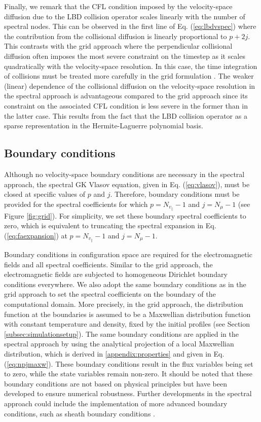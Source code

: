 \documentclass[preprint,12pt]{elsarticle}
\begin{document}
Finally, we remark that the CFL condition imposed by the velocity-space diffusion due to the LBD collision operator scales linearly with the number of spectral nodes. This can be observed in the first line of Eq. (\ref{eq:lbdvspec}) where the contribution from the collisional diffusion is linearly proportional to $p + 2j$. This contrasts with the grid approach where the perpendicular collisional diffusion often imposes the most severe constraint on the timestep as it scales quadratically with the velocity-space resolution. In this case, the time integration of collisions must be treated more carefully in the grid formulation \cite{ulbl2023}. The weaker (linear) dependence of the collisional diffusion on the velocity-space resolution in the spectral approach is advantageous compared to the grid approach since its constraint on the associated CFL condition is less severe in the former than in the latter case. This results from the fact that the LBD collision operator as a sparse representation in the Hermite-Laguerre polynomial basis. 

\subsection{Boundary conditions}
\label{subsec:boundaryconditions}

Although no velocity-space boundary conditions are necessary in the spectral approach, the spectral GK Vlasov equation, given in Eq. (\ref{eq:vlasov}), must be closed at specific values of $p$ and $j$. Therefore, boundary conditions must be provided for the spectral coefficients for which $p = N_{v_\parallel} - 1$ and $j = N_{\mu} - 1$ (see Figure \ref{fig:grid}). For simplicity, we set these boundary spectral coefficients to zero, which is equivalent to truncating the spectral expansion in Eq. (\ref{eq:faexpansion}) at $p = N_{v_\parallel} - 1$ and $j = N_{\mu} - 1$.

Boundary conditions in configuration space are required for the electromagnetic fields and all spectral coefficients. Similar to the grid approach, the electromagnetic fields are subjected to homogeneous Dirichlet boundary conditions everywhere. We also adopt the same boundary conditions as in the grid approach to set the spectral coefficients on the boundary of the computational domain. More precisely, in the grid approach, the distribution function at the boundaries is assumed to be a Maxwellian distribution function with constant temperature and density, fixed by the initial profiles (see Section \ref{subsec:simulationsetup}). The same boundary conditions are applied in the spectral approach by using the analytical projection of a local Maxwellian distribution, which is derived in \ref{appendix:properties} and given in Eq. (\ref{eq:npjmaxw}). These boundary conditions result in the flux variables being set to zero, while the state variables remain non-zero. It should be noted that these boundary conditions are not based on physical principles but have been developed to ensure numerical robustness. Further developments in the spectral approach could include the implementation of more advanced boundary conditions, such as sheath boundary conditions \cite{loizu2012}. 
\end{document}
